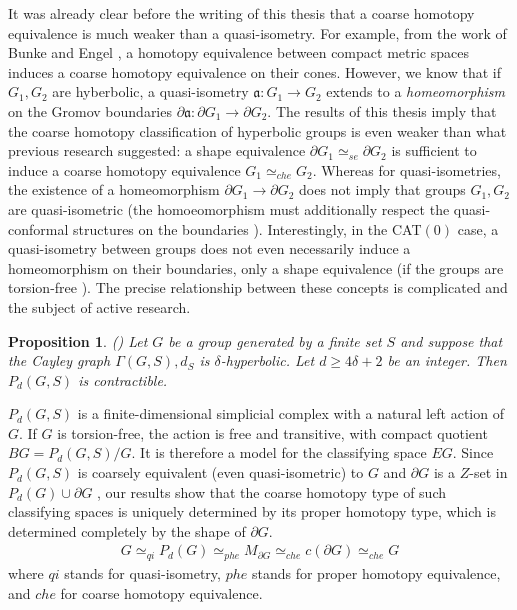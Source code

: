 \documentclass[a4paper,11pt]{article}
\theoremstyle{definition}
\theoremstyle{plain}
\newtheorem{prop}[definition]{Proposition}
\theoremstyle{remark}
\begin{document}
It was already clear before the writing of this thesis that a coarse homotopy equivalence is much weaker than a quasi-isometry. For example, from the work of Bunke and Engel \cite{bunke2020homotopy}, a homotopy equivalence between compact metric spaces induces a coarse homotopy equivalence on their cones. However, we know that if $G_1,G_2$ are hyberbolic, a quasi-isometry $\mathfrak{a}:G_1\rightarrow G_2$ extends to a \textit{homeomorphism} on the Gromov boundaries $\partial \mathfrak{a}: \partial G_1\rightarrow \partial G_2$. The results of this thesis imply that the coarse homotopy classification of hyperbolic groups is even weaker than what previous research suggested: a shape equivalence $\partial G_{1} \simeq_{se} \partial G_{2}$ is sufficient to induce a coarse homotopy equivalence $G_1 \simeq_{che} G_{2}$. Whereas for quasi-isometries, the existence of a homeomorphism $\partial G_{1} \rightarrow \partial G_{2}$ does not imply that groups $G_1,G_2$ are quasi-isometric (the homoeomorphism must additionally respect the quasi-conformal structures on the boundaries \cite{paulin1996groupe}). Interestingly, in the CAT$(0)$ case, a quasi-isometry between groups does not even necessarily induce a homeomorphism on their boundaries, only a shape equivalence (if the groups are torsion-free \cite{bestvina1996local}). The precise relationship between these concepts is complicated and the subject of active research. 

\begin{prop} (\cite{alonso1991notes}) Let $G$ be a group generated by a finite set $S$ and suppose that the Cayley graph $\Gamma(G,S),d_{S}$ is $\delta$-hyperbolic. Let $d\geq 4\delta +2$ be an integer. Then $P_{d}(G,S)$ is contractible.
\end{prop}

$P_{d}(G,S)$ is a finite-dimensional simplicial complex with a natural left action of $G$. If $G$ is torsion-free, the action is free and transitive, with compact quotient $BG = P_{d}(G,S)/G$. It is therefore a model for the classifying space $EG$. Since $P_{d}(G,S)$ is coarsely equivalent (even quasi-isometric) to $G$ and $\partial G$ is a $Z$-set in $P_{d}(G)\cup \partial G$ \cite{bestvina1991boundary}, our results show that the coarse homotopy type of such classifying spaces is uniquely determined by its proper homotopy type, which is determined completely by the shape of $\partial G$.
\begin{align*}
G\simeq_{qi} P_{d}(G)\simeq_{phe} M_{\partial G} \simeq_{che} c(\partial G) \simeq_{che} G
\end{align*} 
where $qi$ stands for quasi-isometry, $phe$ stands for proper homotopy equivalence, and $che$ for coarse homotopy equivalence. \\
\end{document}
